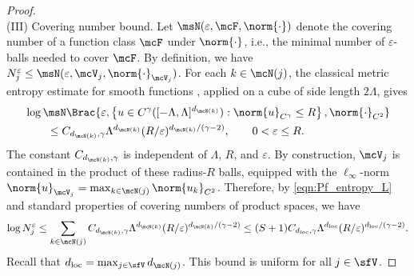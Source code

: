 \documentclass[11pt]{article}
\begin{document}
\begin{proof}
\ \\[-5pt]
\noindent
(III) Covering number bound.
%
Let $\msN(\varepsilon,\mcF,\norm{\cdot})$ denote the covering number of a function class $\mcF$ under $\norm{\cdot}$, i.e., the minimal number of $\varepsilon$-balls needed to cover $\mcF$.
By definition, we have $N_j^\varepsilon \le \msN(\varepsilon,\mcV_j,\norm{\cdot}_{\mcV_j})$.
%
For each $k\in\mcN(j)$, the classical metric entropy estimate for smooth functions \cite{MR1385671}, applied on a cube of side length $2\Lambda$, gives
\begin{equation}
\label{eqn:Pf_entropy_L}
\begin{split}
    &\log \msN\Brac{\varepsilon,
    \left\{u\in C^\gamma([-\Lambda,\Lambda]^{d_{\mcN(k)}}):\norm{u}_{C^\gamma}\le R\right\},
    \norm{\cdot}_{C^2}} \\
    &\qquad\le C_{d_{\mcN(k)},\gamma}\Lambda^{d_{\mcN(k)}}(R/\varepsilon)^{d_{\mcN(k)}/(\gamma-2)},
    \qquad 0<\varepsilon\le R.
\end{split}
\end{equation}
The constant $C_{d_{\mcN(k)},\gamma}$ is independent of $\Lambda$, $R$, and $\varepsilon$.
%
By construction, $\mcV_j$ is contained in the product of these radius-$R$ balls, equipped with the $\ell_\infty$-norm $\norm{u}_{\mcV_j} = \max_{k\in \mcN(j)} \norm{u_k}_{C^2}$.
Therefore, by \eqref{eqn:Pf_entropy_L} and standard properties of covering numbers of product spaces, we have
\begin{equation}
\label{eqn:Pf_NBound}
    \log N_j^\varepsilon
    \le \sum_{k \in \mcN(j)} C_{d_{\mcN(k)},\gamma}\Lambda^{d_{\mcN(k)}}(R/\varepsilon)^{d_{\mcN(k)}/(\gamma-2)}
    \le (S+1)C_{d_{\rm loc},\gamma}\Lambda^{d_{\rm loc}}(R/\varepsilon)^{d_{\rm loc}/(\gamma-2)}.
\end{equation}
Recall that $d_{\rm loc} = \max_{j\in\sfV} d_{\mcN(j)}$.
This bound is uniform for all $j \in \sfV$.



\end{proof}
\end{document}
